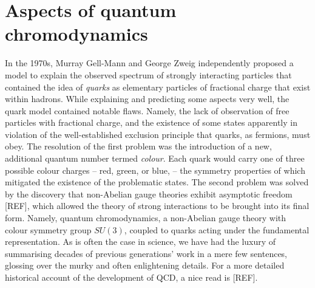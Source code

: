 \documentclass[12pt, a4paper, twoside]{book}
\newcommand{\brac}[1] {\!\left(#1\right)}
\begin{document}
\section{Aspects of quantum chromodynamics}
In the 1970s, Murray Gell-Mann and George Zweig independently proposed a model to explain the observed spectrum of strongly interacting particles that contained the idea of \emph{quarks} as elementary particles of fractional charge that exist within hadrons. While explaining and predicting some aspects very well, the quark model contained notable flaws. Namely, the lack of observation of free particles with fractional charge, and the existence of some states apparently in violation of the well-established exclusion principle that quarks, as fermions, must obey. The resolution of the first problem was the introduction of a new, additional quantum number termed \emph{colour}. Each quark would carry one of three possible colour charges -- red, green, or blue, -- the symmetry properties of which mitigated the existence of the problematic states. The second problem was solved by the discovery that non-Abelian gauge theories exhibit asymptotic freedom [REF], which allowed the theory of strong interactions to be brought into its final form. Namely, quantum chromodynamics, a non-Abelian gauge theory with colour symmetry group \(SU\brac{3}\), coupled to quarks acting under the fundamental representation. As is often the case in science, we have had the luxury of summarising decades of previous generations' work in a mere few sentences, glossing over the murky and often enlightening details. For a more detailed historical account of the development of QCD, a nice read is [REF].  
\end{document}
